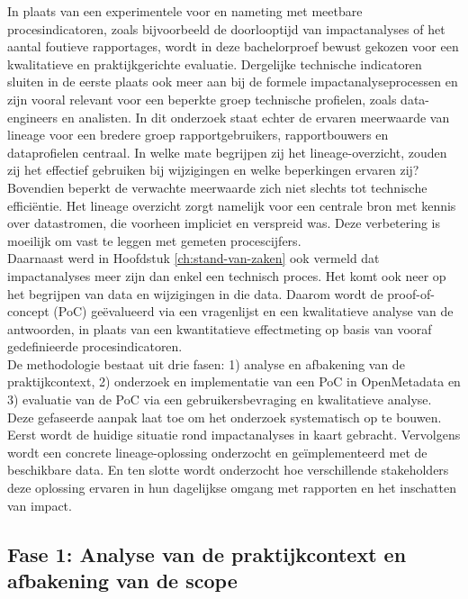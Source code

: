 In plaats van een experimentele voor en nameting met meetbare procesindicatoren, zoals bijvoorbeeld de doorlooptijd van impactanalyses of het aantal foutieve rapportages, wordt in deze bachelorproef bewust gekozen voor een kwalitatieve en praktijkgerichte evaluatie. Dergelijke technische indicatoren sluiten in de eerste plaats ook meer aan bij de formele impactanalyseprocessen en zijn vooral relevant voor een beperkte groep technische profielen, zoals data-engineers en analisten. In dit onderzoek staat echter de ervaren meerwaarde van lineage voor een bredere groep rapportgebruikers, rapportbouwers en dataprofielen centraal. In welke mate begrijpen zij het lineage-overzicht, zouden zij het effectief gebruiken bij wijzigingen en welke beperkingen ervaren zij? Bovendien beperkt de verwachte meerwaarde zich niet slechts tot technische efficiëntie. Het lineage overzicht zorgt namelijk  voor een centrale bron met kennis over datastromen, die voorheen impliciet en verspreid was. Deze verbetering is moeilijk om vast te leggen met gemeten procescijfers.\\

Daarnaast werd in Hoofdstuk \ref{ch:stand-van-zaken} ook vermeld dat impactanalyses meer zijn dan enkel een technisch proces. Het komt ook neer op het begrijpen van data en wijzigingen in die data. Daarom wordt de proof-of-concept (PoC) geëvalueerd via een vragenlijst en een kwalitatieve analyse van de antwoorden, in plaats van een kwantitatieve effectmeting op basis van vooraf gedefinieerde procesindicatoren.\\

De methodologie bestaat uit drie fasen: 1) analyse en afbakening van de praktijkcontext, 2) onderzoek en implementatie van een PoC in OpenMetadata en 3) evaluatie van de PoC via een gebruikersbevraging en kwalitatieve analyse. Deze gefaseerde aanpak laat toe om het onderzoek systematisch op te bouwen. Eerst wordt de huidige situatie rond impactanalyses in kaart gebracht. Vervolgens wordt een concrete lineage-oplossing onderzocht en geïmplementeerd met de beschikbare data. En ten slotte wordt onderzocht hoe verschillende stakeholders deze oplossing ervaren in hun dagelijkse omgang met rapporten en het inschatten van impact.\\

\subsection{Fase 1: Analyse van de praktijkcontext en afbakening van de scope}

